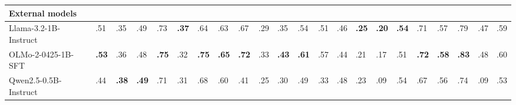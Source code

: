 \begin{tabular}{llllllllllllllllllllll}
\toprule
External models &  &  &  &  &  &  &  &  &  &  &  &  &  &  &  &  &  &  &  &  &  \\
\midrule
Llama-3.2-1B-Instruct & .51 & .35 & .49 & .73 & \textbf{.37} & .64 & .63 & .67 & .29 & .35 & .54 & .51 & .46 & \textbf{.25} & \textbf{.20} & \textbf{.54} & .71 & .57 & .79 & .47 & .59 \\
OLMo-2-0425-1B-SFT & \textbf{.53} & .36 & .48 & \textbf{.75} & .32 & \textbf{.75} & \textbf{.65} & \textbf{.72} & .33 & \textbf{.43} & \textbf{.61} & .57 & .44 & .21 & .17 & .51 & \textbf{.72} & \textbf{.58} & \textbf{.83} & .48 & .60 \\
Qwen2.5-0.5B-Instruct & .44 & \textbf{.38} & \textbf{.49} & .71 & .31 & .68 & .60 & .41 & .25 & .30 & .49 & .33 & .48 & .23 & .09 & .54 & .67 & .56 & .74 & .09 & .53 \\
\bottomrule
\end{tabular}
